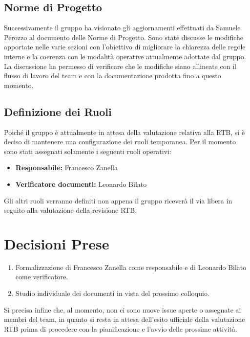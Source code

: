 \documentclass[a4paper, 11pt, oneside]{scrartcl} %
\begin{document}
\subsection{Norme di Progetto}
Successivamente il gruppo ha visionato gli aggiornamenti effettuati da Samuele Perozzo al documento delle Norme di Progetto. Sono state discusse le modifiche apportate nelle varie sezioni con l'obiettivo di migliorare la chiarezza delle regole interne e la coerenza con le modalità operative attualmente adottate dal gruppo.
La discussione ha permesso di verificare che le modifiche siano allineate con il flusso di lavoro del team e con la documentazione prodotta fino a questo momento.

\subsection{Definizione dei Ruoli}
Poiché il gruppo è attualmente in attesa della valutazione relativa alla RTB, si è deciso di mantenere una configurazione dei ruoli temporanea.
Per il momento sono stati assegnati solamente i seguenti ruoli operativi:
\begin{itemize}
    \item \textbf{Responsabile:} Francesco Zanella
    \item \textbf{Verificatore documenti:} Leonardo Bilato
\end{itemize}

Gli altri ruoli verranno definiti non appena il gruppo riceverà il via libera in seguito alla valutazione della revisione RTB.

\newpage
\section{Decisioni Prese}

\begin{enumerate}
    \item Formalizzazione di Francesco Zanella come responsabile e di Leonardo Bilato come verificatore.
    \item Studio individuale dei documenti in vista del prossimo colloquio.
\end{enumerate}
\vspace{0.5cm}
Si precisa infine che, al momento, non ci sono nuove issue aperte o assegnate ai membri del team, in quanto si resta in attesa dell'esito ufficiale della valutazione RTB prima di procedere con la pianificazione e l'avvio delle prossime attività.

\newpage
\end{document}
